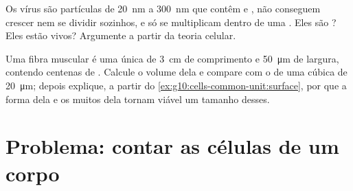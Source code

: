 \begin{exercise}[$\star\star\star$]\label{exo:g10:cells-common-unit:14}
Os vírus são partículas de \qty{20}{nm} a \qty{300}{nm} que contêm
 e , não conseguem crescer nem se dividir
sozinhos, e só se multiplicam dentro de uma . Eles são ?
Eles estão vivos? Argumente a partir da teoria celular.
\end{exercise}

\begin{exercise}[$\star\star\star$]\label{exo:g10:cells-common-unit:15}
Uma fibra muscular é uma única  de \qty{3}{cm} de comprimento e
\qty{50}{\micro m} de largura, contendo centenas de . Calcule o
volume dela e compare com o de uma  cúbica de \qty{20}{\micro m};
depois explique, a partir do \cref{ex:g10:cells-common-unit:surface},
por que a forma dela e os muitos  dela tornam viável um tamanho
desses.
\end{exercise}

\section{Problema: contar as células de um corpo}

